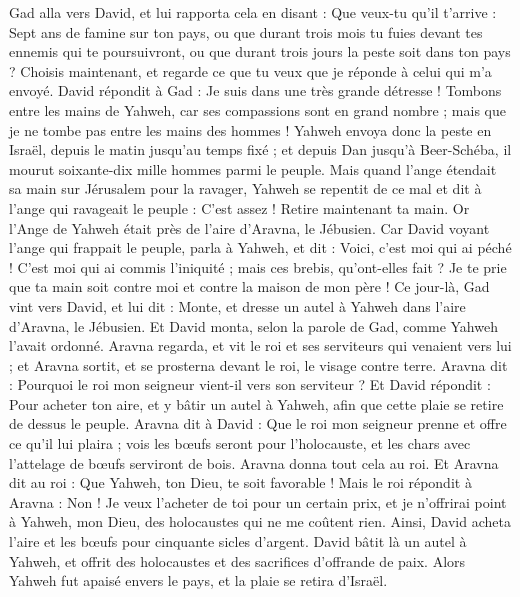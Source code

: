 \begin{multicols}{2}
Gad alla vers David, et lui rapporta cela en disant : Que veux-tu qu'il t'arrive : Sept ans de famine sur ton pays, ou que durant trois mois tu fuies devant tes ennemis qui te poursuivront, ou que durant trois jours la peste soit dans ton pays ? Choisis maintenant, et regarde ce que tu veux que je réponde à celui qui m'a envoyé.
David répondit à Gad : Je suis dans une très grande détresse ! Tombons entre les mains de Yahweh, car ses compassions sont en grand nombre ; mais que je ne tombe pas entre les mains des hommes !
Yahweh envoya donc la peste en Israël, depuis le matin jusqu'au temps fixé ; et depuis Dan jusqu'à Beer-Schéba, il mourut soixante-dix mille hommes parmi le peuple.
Mais quand l'ange étendait sa main sur Jérusalem pour la ravager, Yahweh se repentit de ce mal et dit à l'ange qui ravageait le peuple : C'est assez ! Retire maintenant ta main. Or l'Ange de Yahweh était près de l'aire d'Aravna, le Jébusien.
Car David voyant l'ange qui frappait le peuple, parla à Yahweh, et dit : Voici, c'est moi qui ai péché ! C'est moi qui ai commis l'iniquité ; mais ces brebis, qu'ont-elles fait ? Je te prie que ta main soit contre moi et contre la maison de mon père !
Ce jour-là, Gad vint vers David, et lui dit : Monte, et dresse un autel à Yahweh dans l'aire d'Aravna, le Jébusien.
Et David monta, selon la parole de Gad, comme Yahweh l'avait ordonné.
Aravna regarda, et vit le roi et ses serviteurs qui venaient vers lui ; et Aravna sortit, et se prosterna devant le roi, le visage contre terre.
Aravna dit : Pourquoi le roi mon seigneur vient-il vers son serviteur ? Et David répondit : Pour acheter ton aire, et y bâtir un autel à Yahweh, afin que cette plaie se retire de dessus le peuple.
Aravna dit à David : Que le roi mon seigneur prenne et offre ce qu'il lui plaira ; vois les bœufs seront pour l'holocauste, et les chars avec l'attelage de bœufs serviront de bois.
Aravna donna tout cela au roi. Et Aravna dit au roi : Que Yahweh, ton Dieu, te soit favorable !
Mais le roi répondit à Aravna : Non ! Je veux l'acheter de toi pour un certain prix, et je n'offrirai point à Yahweh, mon Dieu, des holocaustes qui ne me coûtent rien. Ainsi, David acheta l'aire et les bœufs pour cinquante sicles d'argent.
David bâtit là un autel à Yahweh, et offrit des holocaustes et des sacrifices d'offrande de paix. Alors Yahweh fut apaisé envers le pays, et la plaie se retira d'Israël.
\PPE{}
\end{multicols}
